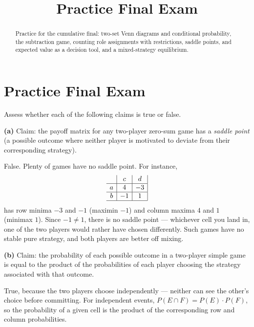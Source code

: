 \documentclass[12pt]{ximera}
\title{Practice Final Exam}
\begin{document}
\begin{abstract}
Practice for the cumulative final: two-set Venn diagrams and conditional probability,
the subtraction game, counting role assignments with restrictions, saddle points, and
expected value as a decision tool, and a mixed-strategy equilibrium.
\end{abstract}
\maketitle

\section*{Practice Final Exam}

\begin{problem}
Assess whether each of the following claims is true or false.

\begin{prompt}
\textbf{(a)} Claim: the payoff matrix for any two-player zero-sum game has a
\emph{saddle point} (a possible outcome where neither player is motivated to deviate
from their corresponding strategy).

\begin{multipleChoice}
\end{multipleChoice}

\begin{feedback}
False. Plenty of games have no saddle point. For instance,
\[
\begin{array}{c|c|c|}
\phantom{|} & c & d \\\hline
a & 4 & -3 \\\hline
b & -1 & 1 \\\hline
\end{array}
\]
has row minima $-3$ and $-1$ (maximin $-1$) and column maxima $4$ and $1$
(minimax $1$). Since $-1\neq 1$, there is no saddle point --- whichever cell you
land in, one of the two players would rather have chosen differently. Such games have
no stable pure strategy, and both players are better off mixing.
\end{feedback}
\end{prompt}

\begin{prompt}
\textbf{(b)} Claim: the probability of each possible outcome in a two-player simple
game is equal to the product of the probabilities of each player choosing the
strategy associated with that outcome.

\begin{multipleChoice}
\end{multipleChoice}

\begin{feedback}
True, because the two players choose independently --- neither can see the other's
choice before committing. For independent events,
$P(E\cap F)=P(E)\cdot P(F)$, so the probability of a given cell is the product of the
corresponding row and column probabilities.
\end{feedback}
\end{prompt}
\end{problem}
\end{document}
